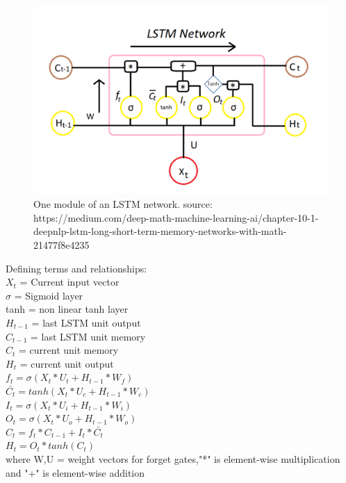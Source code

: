 \documentclass{article}
\begin{document}
\begin{figure}
  \includegraphics[width=\linewidth]{lstm.png}
  \caption{One module of an LSTM network.  source: https://medium.com/deep-math-machine-learning-ai/chapter-10-1-deepnlp-lstm-long-short-term-memory-networks-with-math-21477f8e4235}
  \label{fig:LSTM Module}
\end{figure}

\noindent Defining terms and relationships:\\

\noindent $X_t$ = Current input vector\\
$\sigma$ = Sigmoid layer\\
tanh = non linear tanh layer\\
$H_{t-1}$ = last LSTM unit output\\
$C_{t-1}$ = last LSTM unit memory\\
$C_t$ = current unit memory\\
$H_t$ = current unit output\\

\noindent$f_t = \sigma(X_t * U_t + H_{t-1} * W_f)$\\
$\bar{C_t} = tanh(X_t * U_c + H_{t-1} * W_c)$\\
$I_t = \sigma(X_t * U_i + H_{t-1} * W_i)$\\
$O_t = \sigma(X_t * U_o + H_{t-1} * W_o)$\\

\noindent $C_t = f_t * C_{t-1} + I_t * \bar{C_t}$\\
$H_t = O_t * tanh(C_t)$\\
where W,U = weight vectors for forget gates,"*" is element-wise multiplication and "+" is element-wise addition\\
\end{document}
